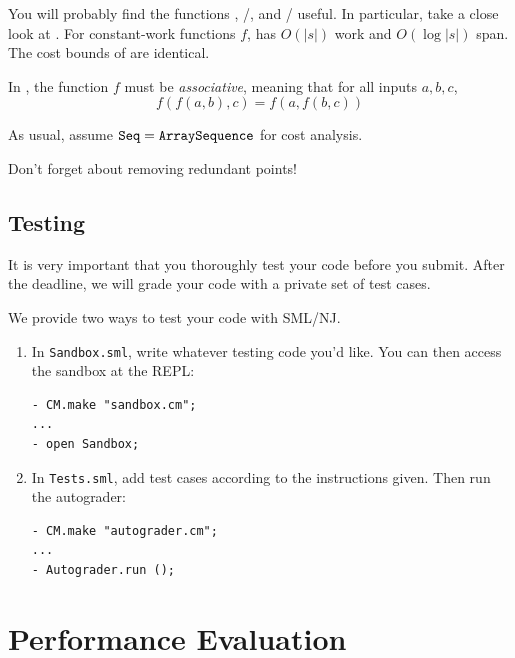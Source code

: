\begin{hint}
You will probably find the functions ,
/, and /
useful. In particular, take a close look at .
For constant-work functions $f$,  has $O(|s|)$ work and
$O(\log|s|)$ span. The cost bounds of  are identical.
\end{hint}

\begin{important}
In , the function $f$ must be \emph{associative}, meaning that
for all inputs $a,b,c$,
\[ f(f(a,b),c) = f(a,f(b,c)) \]
\end{important}

\begin{note}
As usual, assume $\texttt{Seq} = \texttt{ArraySequence}$ for cost analysis.
\end{note}

\begin{note}
Don't forget about removing redundant points!
\end{note}

\subsection{Testing}

It is very important that you thoroughly test your code before you
submit. After the deadline, we will grade your code with a private set of test
cases.

We provide two ways to test your code with SML/NJ.
\begin{enumerate}
  \item
  In \texttt{Sandbox.sml}, write whatever testing code you'd like. You can then
  access the sandbox at the REPL:
\begin{verbatim}
- CM.make "sandbox.cm";
...
- open Sandbox;
\end{verbatim}
%
  \item
  In \texttt{Tests.sml}, add test cases according to the instructions given.
  Then run the autograder:
\begin{verbatim}
- CM.make "autograder.cm";
...
- Autograder.run ();
\end{verbatim}
\end{enumerate}


\section{Performance Evaluation}

